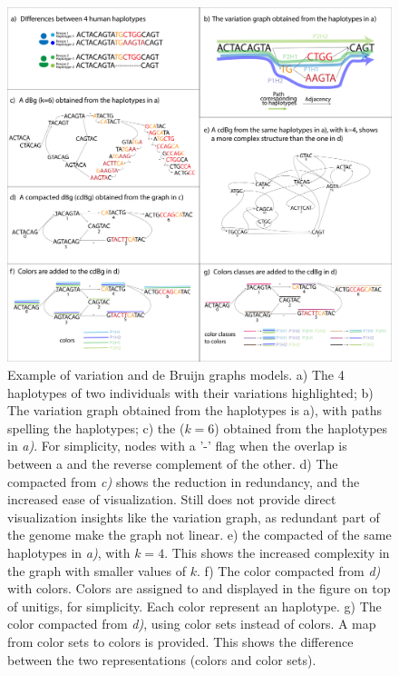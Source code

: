 \begin{figure}[h!]
	\centering
	\includegraphics[width=\linewidth]{figures/background/vg_dbg.pdf}
	\caption[Variation and de Bruijn graphs models.]{Example of variation and de Bruijn graphs models. a) The 4 haplotypes of two individuals with their variations highlighted;
		b) The variation graph obtained from the haplotypes is a), with paths spelling the haplotypes;
		c) the \dbg ($k=6$) obtained from the haplotypes in \emph{a)}. For simplicity, nodes with a '-' flag when the overlap is between a \kmer and the reverse complement of the other. 
		d) The compacted \dbg from \emph{c)} shows the reduction in redundancy, and the increased ease of visualization. Still does not provide direct visualization insights like the variation graph, as redundant part of the genome make the graph not linear.
		e) the compacted \dbg of the same haplotypes in  \emph{a)}, with $k=4$. This shows the increased complexity in the graph with smaller values of $k$.
		f) The color compacted \dbg from  \emph{d)} with colors. Colors are assigned to \kmers and displayed in the figure on top of unitigs, for simplicity. Each color represent an haplotype.
		g) The color compacted \dbg from  \emph{d)}, using color sets instead of colors. A map from color sets to colors is provided. This shows the difference between the two representations (colors and color sets). }
	\label{fig:dbg_vg}
\end{figure}


\printbibliography